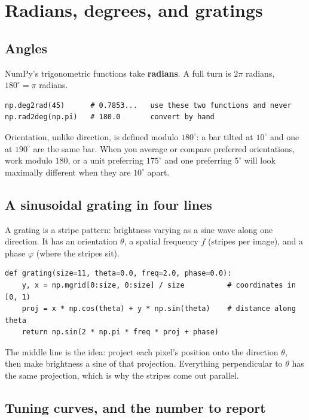 \documentclass[11pt]{article}
\begin{document}
\section{Radians, degrees, and gratings}

\subsection{Angles}

NumPy's trigonometric functions take \textbf{radians}. A full turn is $2\pi$
radians, $180^\circ = \pi$ radians.

\begin{lstlisting}
np.deg2rad(45)      # 0.7853...   use these two functions and never
np.rad2deg(np.pi)   # 180.0       convert by hand
\end{lstlisting}

Orientation, unlike direction, is defined modulo $180^\circ$: a bar tilted at
$10^\circ$ and one at $190^\circ$ are the same bar. When you average or compare
preferred orientations, work modulo $180$, or a unit preferring $175^\circ$ and
one preferring $5^\circ$ will look maximally different when they are
$10^\circ$ apart.

\subsection{A sinusoidal grating in four lines}

A grating is a stripe pattern: brightness varying as a sine wave along one
direction. It has an orientation $\theta$, a spatial frequency $f$ (stripes per
image), and a phase $\varphi$ (where the stripes sit).

\begin{lstlisting}
def grating(size=11, theta=0.0, freq=2.0, phase=0.0):
    y, x = np.mgrid[0:size, 0:size] / size          # coordinates in [0, 1)
    proj = x * np.cos(theta) + y * np.sin(theta)    # distance along theta
    return np.sin(2 * np.pi * freq * proj + phase)
\end{lstlisting}

The middle line is the idea: project each pixel's position onto the direction
$\theta$, then make brightness a sine of that projection. Everything
perpendicular to $\theta$ has the same projection, which is why the stripes come
out parallel.

\subsection{Tuning curves, and the number to report}
\end{document}
